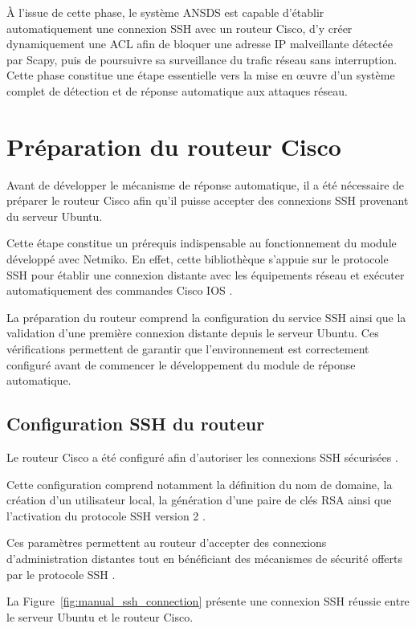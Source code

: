 À l'issue de cette phase, le système ANSDS est capable d'établir automatiquement une connexion SSH avec un routeur Cisco, d'y créer dynamiquement une ACL afin de bloquer une adresse IP malveillante détectée par Scapy, puis de poursuivre sa surveillance du trafic réseau sans interruption. Cette phase constitue une étape essentielle vers la mise en œuvre d'un système complet de détection et de réponse automatique aux attaques réseau.

\section{Préparation du routeur Cisco}

Avant de développer le mécanisme de réponse automatique, il a été nécessaire de préparer le routeur Cisco afin qu'il puisse accepter des connexions SSH provenant du serveur Ubuntu.

Cette étape constitue un prérequis indispensable au fonctionnement du module développé avec Netmiko. En effet, cette bibliothèque s'appuie sur le protocole SSH pour établir une connexion distante avec les équipements réseau et exécuter automatiquement des commandes Cisco IOS \cite{netmiko_docs,rfc4253,cisco_ios}.

La préparation du routeur comprend la configuration du service SSH ainsi que la validation d'une première connexion distante depuis le serveur Ubuntu. Ces vérifications permettent de garantir que l'environnement est correctement configuré avant de commencer le développement du module de réponse automatique.

\subsection{Configuration SSH du routeur}

Le routeur Cisco a été configuré afin d'autoriser les connexions SSH sécurisées \cite{rfc4253,cisco_ios}.

Cette configuration comprend notamment la définition du nom de domaine, la création d'un utilisateur local, la génération d'une paire de clés RSA ainsi que l'activation du protocole SSH version 2 \cite{cisco_ios}.

Ces paramètres permettent au routeur d'accepter des connexions d'administration distantes tout en bénéficiant des mécanismes de sécurité offerts par le protocole SSH \cite{rfc4253,cisco_ios}.

La Figure~\ref{fig:manual_ssh_connection} présente une connexion SSH réussie entre le serveur Ubuntu et le routeur Cisco.

